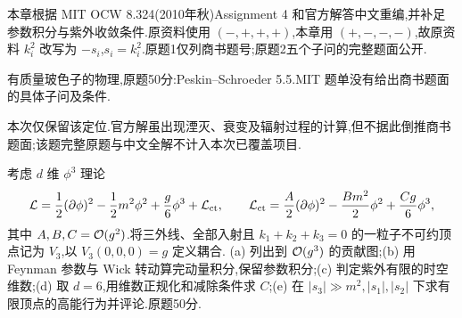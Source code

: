 本章根据 MIT OCW 8.324(2010年秋)Assignment 4 和官方解答中文重编,并补足参数积分与紫外收敛条件.原资料使用 $(-,+,+,+)$,本章用 $(+,-,-,-)$,故原资料 $k_i^2$ 改写为 $-s_i$,$s_i=k_i^2$.原题1仅列商书题号;原题2五个子问的完整题面公开.

\begin{exercise}
有质量玻色子的物理,原题50分:Peskin--Schroeder 5.5.MIT 题单没有给出商书题面的具体子问及条件.
\end{exercise}
\begin{solution}
本次仅保留该定位.官方解虽出现湮灭、衰变及辐射过程的计算,但不据此倒推商书题面;该题完整原题与中文全解不计入本次已覆盖项目.
\end{solution}

\begin{exercise}
考虑 $d$ 维 $\phi^3$ 理论
\[
\mathcal L=\frac12(\partial\phi)^2-\frac12m^2\phi^2+\frac g6\phi^3+\mathcal L_{\rm ct},
\qquad
\mathcal L_{\rm ct}=\frac A2(\partial\phi)^2-\frac{Bm^2}{2}\phi^2+\frac{Cg}{6}\phi^3,
\]
其中 $A,B,C=\mathcal O(g^2)$.将三外线、全部入射且 $k_1+k_2+k_3=0$ 的一粒子不可约顶点记为 $V_3$,以 $V_3(0,0,0)=g$ 定义耦合.
(a) 列出到 $\mathcal O(g^3)$ 的贡献图;(b) 用 Feynman 参数与 Wick 转动算完动量积分,保留参数积分;(c) 判定紫外有限的时空维数;(d) 取 $d=6$,用维数正规化和减除条件求 $C$;(e) 在 $|s_3|\gg m^2,|s_1|,|s_2|$ 下求有限顶点的高能行为并评论.原题50分.
\end{exercise}
